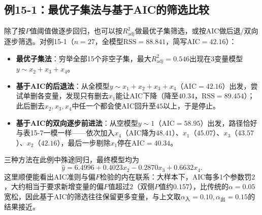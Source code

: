 \subsection{例15-1：最优子集法与基于AIC的筛选比较}
除了按$P$值阈值做逐步回归，也可以按$R_{\mathrm{adj}}^2$做最优子集筛选，或按AIC做后退/双向逐步筛选。对例15-1（$n=27$，全模型$\mathrm{RSS}=88.841$，简写$\mathrm{AIC}=42.16$）：
\begin{itemize}
\item \textbf{最优子集法}：穷举全部15个非空子集，最大$R_{\mathrm{adj}}^2=0.546$出现在3变量模型$y\sim x_2+x_3+x_4$。
\item \textbf{基于AIC的后退法}：从全模型$y\sim x_1+x_2+x_3+x_4$（$\mathrm{AIC}=42.16$）出发，尝试单删各变量，发现只有删去$x_1$能让AIC下降（降至$40.34$，$\mathrm{RSS}=89.454$）；此后删去$x_2,x_3,x_4$中任一个都会使AIC回升至$45$以上，于是停止。
\item \textbf{基于AIC的双向逐步前进法}：从空模型$y\sim 1$（$\mathrm{AIC}=58.95$）出发，路径恰好与表15-7一模一样——依次加入$x_4$（AIC降为$48.41$）、$x_1$（$45.07$）、$x_3$（$43.57$）、$x_2$（$42.16$），最后一步剔除$x_1$停在$\mathrm{AIC}=40.34$。
\end{itemize}
三种方法在此例中殊途同归，最终模型均为
\[
\widehat y=6.4996+0.4023x_2-0.2870x_3+0.6632x_4.
\]
这里顺便能看出AIC准则与偏$F$检验的内在联系：大样本下，AIC每多1个参数罚$2$，大约相当于要求新增变量的偏$F$值超过$2$（双侧$P$值约$0.157$），比传统的$\alpha=0.05$宽松，因此基于AIC的筛选往往保留更多变量，与上文取$\alpha_{\text{入}}=0.10,\alpha_{\text{出}}=0.15$的结果接近。


